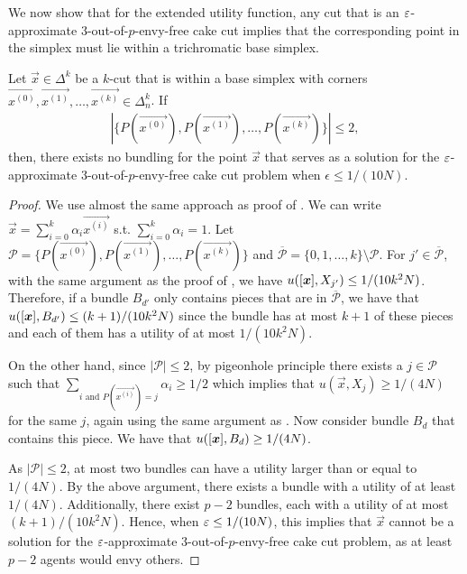We now show that for the extended utility function, any cut that is an $\varepsilon$-approximate 3-out-of-$p$-envy-free cake cut implies that the corresponding point in the simplex must lie within a trichromatic base simplex.


\begin{lemma}\label{lem:envy-free-colors-base-2}
    Let $\vec{x} \in \Delta^k $ be a $k$-cut that is within a base simplex with corners $\vec{x^{(0)}}, \vec{x^{(1)}}, \ldots, \vec{x^{(k)}} \in \Delta^k_n$. If \begin{align*}
        \left|\{P(\vec{x^{(0)}}), P(\vec{x^{(1)}}), \ldots, P(\vec{x^{(k)}})\}\right| \leq 2,
    \end{align*} 
    then, there exists no bundling for the point $\vec{x}$ that serves as a solution for the $\varepsilon$-approximate 3-out-of-$p$-envy-free cake cut problem when $\epsilon \leq 1/(10N)$.
\end{lemma}
\begin{proof}
    We use almost the same approach as proof of . We can write $\vec{x} = \sum_{i=0}^k \alpha_i \vec{x^{(i)}}$ s.t. $\sum_{i=0}^k \alpha_i=1$.
    Let $\mathcal{P} = \{P(\vec{x^{(0)}}), P(\vec{x^{(1)}}), \ldots, P(\vec{x^{(k)}})\}$ and $\overline{\mathcal{P}} = \{0, 1, \ldots, k\} \setminus \mathcal{P}$. For $j' \in \overline{\mathcal{P}}$, with the same argument as the proof of , we have $u([\boldsymbol{x}], X_{j'}) \leq 1/(10k^2 N)$. Therefore, if a bundle $B_{d'}$ only contains pieces that are in $\overline{\mathcal{P}}$, we have that $u([\boldsymbol{x}], B_{d'}) \leq (k+1)/(10k^2N)$ since the bundle has at most $k+1$ of these pieces and each of them has a utility of at most $1/(10k^2 N)$.
    
    
    On the other hand, since $|\mathcal{P}| \leq 2$, by pigeonhole principle there exists a $j \in \mathcal{P}$ such that $\sum_{i \text{ and } P(\vec{x^{(i)}}) = j} \alpha_i \geq 1/2$ which implies that $u(\vec{x}, X_{j}) \geq 1/(4N)$ for the same $j$, again using the same argument as . Now consider bundle $B_d$ that contains this piece. We have that $u([\boldsymbol{x}], B_d) \geq 1/(4N)$. 


    As $|\mathcal{P}| \leq 2$, at most two bundles can have a utility larger than or equal to $1/(4N)$. By the above argument, there exists a bundle with a utility of at least $1/(4N)$. Additionally, there exist $p - 2$ bundles, each with a utility of at most $(k+1)/(10k^2N)$. Hence, when $\varepsilon \leq 1/(10N)$, this implies that $\vec{x}$ cannot be a solution for the $\varepsilon$-approximate 3-out-of-$p$-envy-free cake cut problem, as at least $p-2$ agents would envy others.
\end{proof}














